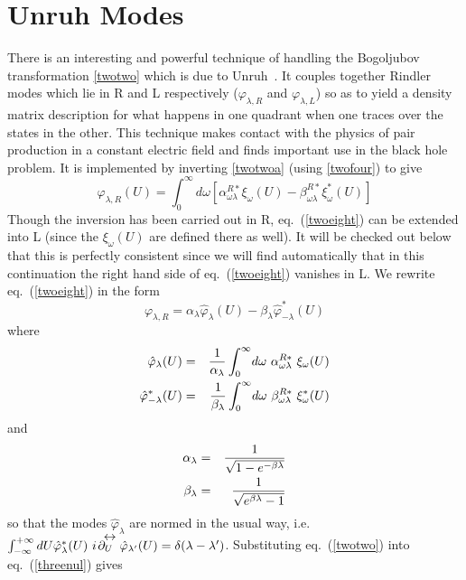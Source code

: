 \documentclass[12pt,oneside]{report}
\def\om{\omega	}
\def\la{\lambda}
\def\lr #1{\mathrel{#1\kern-.75em\raise1.75ex\hbox{$\leftrightarrow$}}}
\begin{document}
\section{Unruh Modes}\label{unruh}
There is an interesting and powerful technique of handling the Bogoljubov
transformation \ref{twotwo} which is due to Unruh~\cite{Unru1}. It couples
together Rindler modes which lie in R and L respectively
($\varphi_{\la,R}$ and  $\varphi_{\la,L}$) so as to yield
 a density matrix description for what happens in one quadrant when
one traces over the states in the other. This technique makes contact with
the physics of pair production in a constant electric field 
and finds important use in the black hole problem. It is
implemented by inverting \ref{twotwoa} (using \ref{twofour}) to give
\begin{equation} \varphi_{\la,R}(U) = \int_0^\infty d \om 
\left[
\alpha_{\om \la}^{R *} \xi_\om (U) -
\beta_{\om \la}^{R *} \xi_\om^* (U)\right ]
\label{twoeight}
\end{equation}
Though the inversion has been
carried out in R, eq.~(\ref{twoeight}) can be extended into L (since the
$\xi_\om (U) $ are defined there as well). It will be checked out below
that this is perfectly consistent since we will find automatically that in
this continuation the right hand side of eq.~(\ref{twoeight}) vanishes in L.
We rewrite eq.~(\ref{twoeight}) in the form 
\begin{equation}
\varphi_{\la,R} = \alpha_\la \hat \varphi_\la	(U) - \beta_\la
\hat \varphi_{ - \la}^*	(U)
\label{twonine}
\end{equation}
where 
\begin{eqnarray}
\hat \varphi_\la	(U) &=&
{1 \over \alpha_\la}\int_0^\infty \! d \om \ 
\alpha_{\om \la}^{R *}\ \xi_\om (U) \nonumber\\
\hat\varphi_{ - \la}^*	(U) &=&{1 \over \beta_\la}
\int_0^\infty \! d \om \ 
\beta_{\om \la}^{R *}\ \xi_\om^* (U)
\label{threenul}
\end{eqnarray}
and
\begin{eqnarray}
\alpha_\la &=& {1 \over \sqrt{1 - e^{- \beta \la}}}
\nonumber\\
\beta_\la &=& {1 \over \sqrt{ e^{ \beta \la} -1}}\label{threeone}
\end{eqnarray}
so that the modes $\hat \varphi_\la$ are normed in the usual way, i.e.
$ \int_{-\infty}^{+\infty} dU \hat \varphi_\la^*(U) \ i\! \lr {\partial_U} \hat
\varphi_{\la^\prime}(U) = \delta(\la - \la^\prime)$. Substituting
eq.~(\ref{twotwo}) into eq.~(\ref{threenul}) gives 
\end{document}
